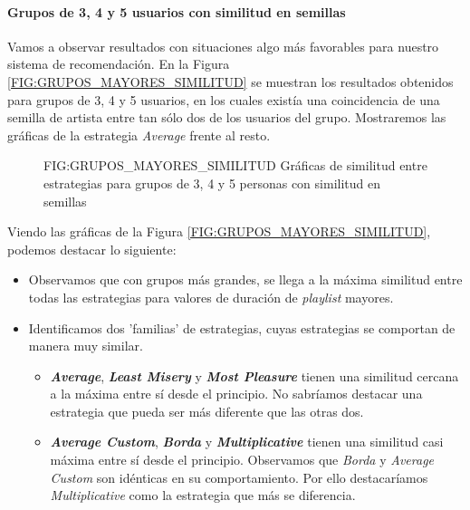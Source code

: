 \paragraph{Grupos de 3, 4 y 5 usuarios con similitud en semillas}

Vamos a observar resultados con situaciones algo más favorables para nuestro sistema de recomendación. En la Figura \ref{FIG:GRUPOS_MAYORES_SIMILITUD}
se muestran los resultados obtenidos para grupos de 3, 4 y 5 usuarios, en los cuales existía una coincidencia de una semilla de artista entre tan sólo
dos de los usuarios del grupo. Mostraremos las gráficas de la estrategia \textit{Average} frente al resto.

\begin{figure}[Gráficas de similitud entre estrategias para grupos de 3, 4 y 5 personas con similitud en semillas]{FIG:GRUPOS_MAYORES_SIMILITUD}
    {Gráficas de similitud entre estrategias para grupos de 3, 4 y 5 personas con similitud en semillas}
\end{figure}

Viendo las gráficas de la Figura \ref{FIG:GRUPOS_MAYORES_SIMILITUD}, podemos destacar lo siguiente:

\begin{itemize}
    \item Observamos que con grupos más grandes, se llega a la máxima similitud entre todas las estrategias para valores de duración de \textit{playlist} mayores. 
    \item Identificamos dos 'familias' de estrategias, cuyas estrategias se comportan de manera muy similar.
    \begin{itemize}
        \item \textbf{\textit{Average}}, \textbf{\textit{Least Misery}} y \textbf{\textit{Most Pleasure}} tienen una similitud cercana a la máxima entre sí desde el principio. No sabríamos
        destacar una estrategia que pueda ser más diferente que las otras dos.
        \item \textbf{\textit{Average Custom}}, \textbf{\textit{Borda}} y \textbf{\textit{Multiplicative}} tienen una similitud casi máxima entre sí desde el principio. Observamos que
        \textit{Borda} y \textit{Average Custom} son idénticas en su comportamiento. Por ello destacaríamos \textit{Multiplicative} como la estrategia que más se diferencia.
    \end{itemize}
\end{itemize}


